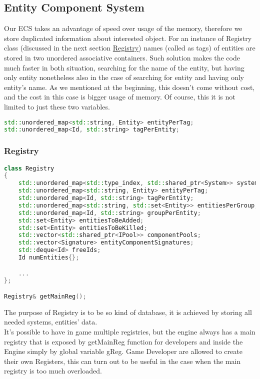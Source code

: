 \subsection{Entity Component System}
Our ECS takes an advantage of speed over usage of the memory, therefore we store duplicated information about interested object. For an instance of Registry class (discussed in the next section \hyperref[sec:registry]{Registry}) names (called as tags) of entities are stored in two unordered associative containers. Such solution makes the code much faster in both situation, searching for the name of the entity, but having only entity nonetheless also in the case of searching for entity and having only entity's name.
As we mentioned at the beginning, this doesn't come without cost, and the cost in this case is bigger usage of memory.
Of course, this it is not limited to just these two variables.

\begin{lstlisting}[language=c++, caption=Entities' name (./engine/include/tsengine/ecs/ecs.h)]
std::unordered_map<std::string, Entity> entityPerTag;
std::unordered_map<Id, std::string> tagPerEntity;
\end{lstlisting}

\newpage

\subsubsection{Registry}
 \label{sec:registry}
\begin{lstlisting}[language=c++, caption=Registry class]
class Registry
{
    std::unordered_map<std::type_index, std::shared_ptr<System>> systems;
    std::unordered_map<std::string, Entity> entityPerTag;
    std::unordered_map<Id, std::string> tagPerEntity;
    std::unordered_map<std::string, std::set<Entity>> entitiesPerGroup;
    std::unordered_map<Id, std::string> groupPerEntity;
    std::set<Entity> entitiesToBeAdded;
    std::set<Entity> entitiesToBeKilled;
    std::vector<std::shared_ptr<IPool>> componentPools;
    std::vector<Signature> entityComponentSignatures;
    std::deque<Id> freeIds;
    Id numEntities{};

    ...
};

Registry& getMainReg();
\end{lstlisting}
The purpose of Registry is to be so kind of database, it is achieved by storing all needed systems, entities' data.\\
It's possible to have in game multiple registries, but the engine always has a main registry that is exposed by getMainReg function for developers and inside the Engine simply by global variable gReg.
Game Developer are allowed to create their own Registers, this can turn out to be useful in the case when the main registry is too much overloaded.

